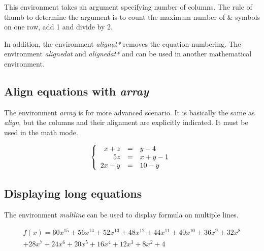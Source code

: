 \documentclass{article}
\begin{document}
This environment takes an argument specifying number of columns. The rule of thumb to determine the argument is to count the maximum number of \& symbols on one row, add 1 and divide by 2.

In addition, the environment \emph{alignat*} removes the equation numbering. The environment \emph{alignedat} and \emph{alignedat*} and can be used in another mathematical environment.


\subsection*{Align equations with \emph{array}}

The environment \emph{array} is for more advanced scenario. It is basically the same as \emph{align}, but the columns and their alignment are explicitly indicated. It must be used in the math mode.

\[
\left\{
\begin{array}{ r c l}
		x + z &=& y - 4 \\
		5z &=& x + y -1 \\
		2x - y &=& 10 - y
\end{array}
\right.
\]


\subsection*{Displaying long equations}

The environment \emph{multline} can be used to display formula on multiple lines.

\begin{multline*}
	f(x) = 60x^{15} + 56x^{14} + 52x^{13} + 48x^{12} + 44x^{11} + 40x^{10} + 36x^{9} + 32x^{8}\\
	+ 28x^{7} + 24x^{6} + 20x^{5} + 16x^{4} + 12x^{3} + 8x^{2} + 4
\end{multline*}
\end{document}
